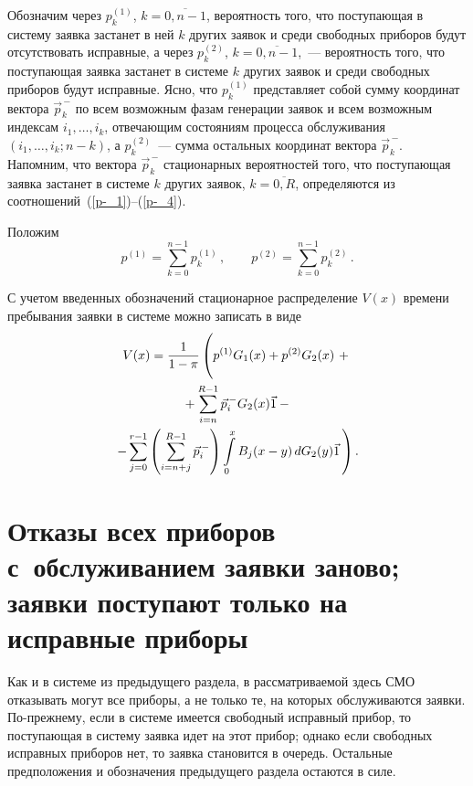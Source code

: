 \begin{multicols}{2}
Обозначим через $p_k^{(1)}$, $k=\overline{0,n-1}$, вероятность того, что 
по\-ступа\-ющая в систему заявка застанет в ней $k$ других заявок и среди 
свободных приборов будут отсутствовать исправные, а через $p_k^{(2)}$, 
$k=\overline{0,n-1}$,~--- вероятность того, что по\-сту\-па\-ющая заявка 
застанет в системе $k$ других заявок и среди свободных приборов будут 
исправные. Ясно, что $p_k^{(1)}$ представляет собой сумму координат вектора 
$\vec p_k^{\,-}$ по всем возможным фазам генерации заявок и всем возможным 
индексам $i_1,\ldots,i_{k}$, отвечающим состояниям процесса обслуживания 
$(i_1,\ldots,i_{k};n-k)$, а $p_k^{(2)}$~--- сумма остальных координат вектора 
$\vec p_k^{\,-}$. Напомним, что вектора $\vec p_k^{\,-}$ стационарных 
вероятностей того, что поступающая заявка застанет в системе $k$ других заявок, 
$k=\overline{0,R}$, определяются из соотношений~(\ref{p-_1})--(\ref{p-_4}).

Положим
$$
p^{(1)}=\sum\limits_{k=0}^{n-1} p_k^{(1)}\,,\qquad
p^{(2)}=\sum\limits_{k=0}^{n-1} p_k^{(2)}\,.
$$


С учетом введенных обозначений стационарное распределение $V(x)$ времени
пребывания заявки в системе можно записать в виде %
\begin{multline*}
V(x) = \frac{1}{1-\pi} \left( \vphantom{\int\limits_0^x}
p^{(1)}G_1(x) + p^{(2)}G_2(x) \right. + {}\\
{}+\sum\limits_{i=n}^{R-1}
\vec p_{i}^{\,-} G_2(x) {\vec 1} -{}
\\
\left. -
\sum\limits_{j=0}^{r-1}
\left(
\sum\limits_{i=n+j}^{R-1} \vec p_{i}^{\,-}
\right)
\int\limits_0^x
B_{j}(x-y)\,
dG_2(y)
{\vec 1}\,
\right).
\end{multline*}

\section{Отказы всех приборов с~обслуживанием заявки заново; заявки
поступают только на исправные приборы}

Как и в системе из предыдущего раздела, в рассматриваемой здесь СМО отказывать 
могут все приборы, а не только те, на которых обслуживаются заявки. 
По-прежнему, если в системе имеется свободный исправный прибор, то поступающая 
в систему заявка идет на этот прибор; однако если свободных исправных приборов 
нет, то заявка становится в очередь. Остальные предположения и обозначения 
предыдущего раздела остаются в %
силе.


\end{multicols}
